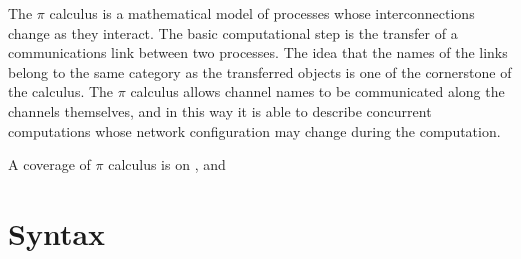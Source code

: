 
The $\pi$ calculus is a mathematical model of processes whose interconnections change as they interact. The basic computational step is the transfer of a communications link between two processes. The idea that the names of the links belong to the same category as the transferred objects is one of the cornerstone of the calculus. The $\pi$ calculus allows channel names to be communicated along the channels themselves, and in this way it is able to describe concurrent computations whose network configuration may change during the computation.

A coverage of $\pi$ calculus is on \cite{parrow}, \cite{sangiorgiwalker} and \cite{milner}

\section{Syntax}

